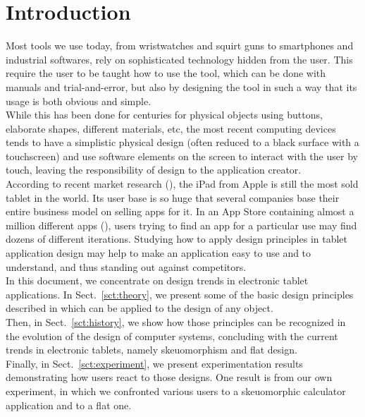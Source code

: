 \documentclass[a4paper,11pt] {article}
\theoremstyle{definition}
\begin{document}
\pagebreak

\tableofcontents
\pagebreak

\section{Introduction}

Most tools we use today, from wristwatches and squirt guns to smartphones and industrial softwares, rely on sophisticated technology hidden from the user. This require the user to be taught how to use the tool, which can be done with manuals and trial-and-error, but also by designing the tool in such a way that its usage is both obvious and simple.\\

While this has been done for centuries for physical objects using buttons, elaborate shapes, different materials, etc, the most recent computing devices tends to have a simplistic physical design (often reduced to a black surface with a touchscreen) and use software elements on the screen to interact with the user by touch, leaving the responsibility of design to the application creator.\\

According to recent market research (\cite{ABI-android}), the iPad from Apple is still the most sold tablet in the world. Its user base is so huge that several companies base their entire business model on selling apps for it. In an App Store containing almost a million different apps (\cite{iOs61}), users trying to find an app for a particular use may find dozens of different iterations. Studying how to apply design principles in tablet application design may help to make an application easy to use and to understand, and thus standing out against competitors.\\

In this document, we concentrate on design trends in electronic tablet applications. In Sect.~\ref{sct:theory}, we present some of the basic design principles described in \cite{Norman02} which can be applied to the design of any object.\\

Then, in Sect.~\ref{sct:history}, we show how those principles can be recognized in the evolution of the design of computer systems, concluding with the current trends in electronic tablets, namely skeuomorphism and flat design.\\

Finally, in Sect.~\ref{sct:experiment}, we present experimentation results demonstrating how users react to those designs. One result is from our own experiment, in which we confronted various users to a skeuomorphic calculator application and to a flat one.\\
\end{document}
